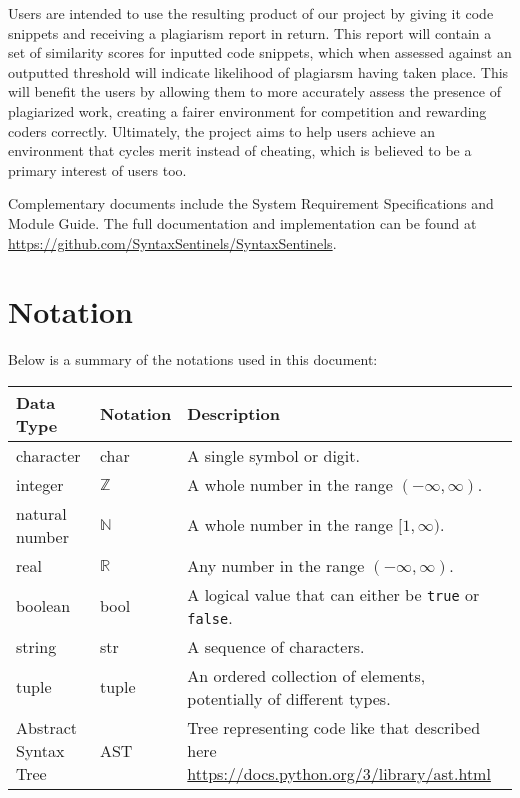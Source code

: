 \documentclass[12pt, titlepage]{article}
\begin{document}
Users are intended to use the resulting product of our project by giving
it code snippets and receiving a plagiarism report in return. This report
will contain a set of similarity scores for inputted code snippets, which when
assessed against an outputted threshold will indicate likelihood of plagiarsm
having taken place. This will benefit the users by allowing them to more accurately assess the presence of plagiarized work, 
creating a fairer environment for competition and rewarding coders correctly. 
Ultimately, the project aims to help users achieve an environment that cycles merit 
instead of cheating, which is believed to be a primary interest of users too.

Complementary documents include the System Requirement Specifications
and Module Guide.  The full documentation and implementation can be
found at \url{https://github.com/SyntaxSentinels/SyntaxSentinels}. 

\section{Notation}

Below is a summary of the notations used in this document:

\begin{center}
\renewcommand{\arraystretch}{1.2}
\noindent
\begin{tabular}{l l p{8cm}} 
\toprule 
\textbf{Data Type} & \textbf{Notation} & \textbf{Description} \\ 
\midrule
character & char & A single symbol or digit. \\ 
integer & $\mathbb{Z}$ & A whole number in the range $(-\infty, \infty)$. \\ 
natural number & $\mathbb{N}$ & A whole number in the range $[1, \infty)$. \\ 
real & $\mathbb{R}$ & Any number in the range $(-\infty, \infty)$. \\ 
boolean & bool & A logical value that can either be \texttt{true} or \texttt{false}. \\
string & str & A sequence of characters. \\ 
tuple & tuple & An ordered collection of elements, potentially of different types. \\
Abstract Syntax Tree & AST & Tree representing code like that described here \url{https://docs.python.org/3/library/ast.html} \\
\bottomrule
\end{tabular} 
\end{center}
\end{document}
